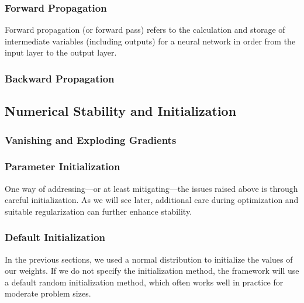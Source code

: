 \documentclass[a4paper,12pt]{article}
\theoremstyle{definition}
\begin{document}
        \subsubsection*{Forward Propagation}
            Forward propagation (or forward pass) refers to the calculation and storage of intermediate variables (including outputs) for a neural network in order from 
            the input layer to the output layer. 
        \subsubsection*{Backward Propagation}



    \subsection*{Numerical Stability and Initialization}
    \subsubsection*{Vanishing and Exploding Gradients}
    
    \subsubsection*{Parameter Initialization}
    One way of addressing—or at least mitigating—the issues raised above is through careful initialization. As we will see later, additional care during optimization and 
    suitable regularization can further enhance stability.

    \subsubsection*{Default Initialization}
    In the previous sections, we used a normal distribution to initialize the values of our weights. If we do not specify the initialization method, the framework will 
    use a default random initialization method, which often works well in practice for moderate problem sizes.
\end{document}
